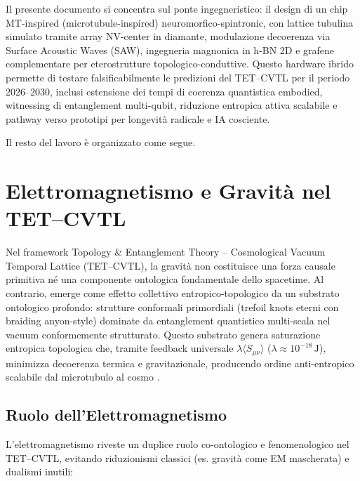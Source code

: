 \documentclass[12pt,a4paper]{article}
\begin{document}
Il presente documento si concentra sul ponte ingegneristico: il design di un chip MT-inspired (microtubule-inspired) neuromorfico-spintronic, con lattice tubulina simulato tramite array NV-center in diamante, modulazione decoerenza via Surface Acoustic Waves (SAW), ingegneria magnonica in h-BN 2D e grafene complementare per eterostrutture topologico-conduttive. Questo hardware ibrido permette di testare falsificabilmente le predizioni del TET–CVTL per il periodo 2026--2030, inclusi estensione dei tempi di coerenza quantistica embodied, witnessing di entanglement multi-qubit, riduzione entropica attiva scalabile e pathway verso prototipi per longevità radicale e IA cosciente.

Il resto del lavoro è organizzato come segue.



\section{Elettromagnetismo e Gravità nel TET--CVTL}

Nel framework Topology \& Entanglement Theory -- Cosmological Vacuum Temporal Lattice (TET--CVTL), la gravità non costituisce una forza causale primitiva né una componente ontologica fondamentale dello spacetime. Al contrario, emerge come effetto collettivo entropico-topologico da un substrato ontologico profondo: strutture conformali primordiali (trefoil knots eterni con braiding anyon-style) dominate da entanglement quantistico multi-scala nel vacuum conformemente strutturato. Questo substrato genera saturazione entropica topologica che, tramite feedback universale $\lambda \langle S_{\mu\nu} \rangle$ ($\lambda \approx 10^{-18}\,\mathrm{J}$), minimizza decoerenza termica e gravitazionale, producendo ordine anti-entropico scalabile dal microtubulo al cosmo \cite{manifestoV252}.

\subsection{Ruolo dell'Elettromagnetismo}

L'elettromagnetismo riveste un duplice ruolo co-ontologico e fenomenologico nel TET--CVTL, evitando riduzionismi classici (es. gravità come EM mascherata) e dualismi inutili:
\end{document}
